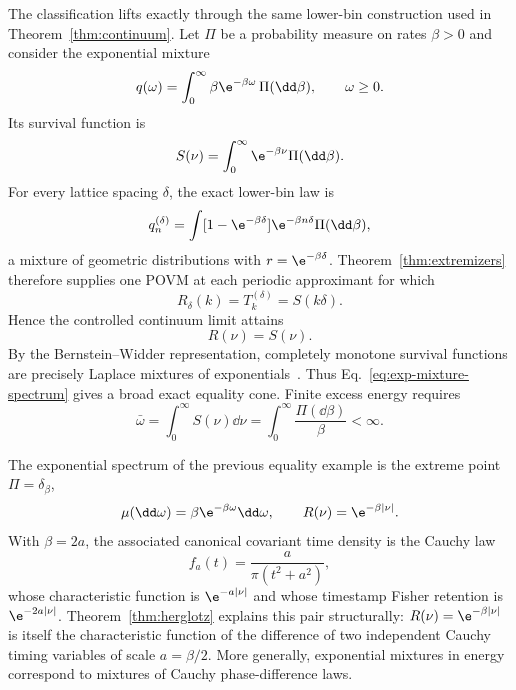 The classification lifts exactly through the same lower-bin construction used in Theorem~\ref{thm:continuum}.  Let $\Pi$ be a probability measure on rates $\beta>0$ and consider the exponential mixture
\begin{equation}
 q(\omega)=\int_0^\infty \beta\e^{-\beta\omega}\,\Pi(\dd\beta),
 \qquad \omega\geq0.
 \label{eq:exp-mixture-spectrum}
\end{equation}
Its survival function is
\begin{equation}
 S(\nu)=\int_0^\infty\e^{-\beta\nu}\Pi(\dd\beta).
 \label{eq:CM-survival}
\end{equation}
For every lattice spacing $\delta$, the exact lower-bin law is
\begin{equation}
 q_n^{(\delta)}
 =\int[1-\e^{-\beta\delta}]\e^{-\beta n\delta}\Pi(\dd\beta),
 \label{eq:lower-bin-mixture}
\end{equation}
a mixture of geometric distributions with $r=\e^{-\beta\delta}$.  Theorem~\ref{thm:extremizers} therefore supplies one POVM at each periodic approximant for which
\begin{equation}
 R_\delta(k)=T_k^{(\delta)}=S(k\delta).
\end{equation}
Hence the controlled continuum limit attains
\begin{equation}
 R(\nu)=S(\nu).
 \label{eq:CM-continuum-equality}
\end{equation}
By the Bernstein--Widder representation, completely monotone survival functions are precisely Laplace mixtures of exponentials~\cite{SchillingSongVondracek2012}.  Thus Eq.~\eqref{eq:exp-mixture-spectrum} gives a broad exact equality cone.  Finite excess energy requires
\begin{equation}
 \bar\omega=\int_0^\infty S(\nu)\dd\nu
 =\int_0^\infty\frac{\Pi(\dd\beta)}{\beta}<\infty.
 \label{eq:CM-mean}
\end{equation}

The exponential spectrum of the previous equality example is the extreme point $\Pi=\delta_\beta$,
\begin{equation}
 \mu(\dd\omega)=\beta\e^{-\beta\omega}\dd\omega,
 \qquad
 R(\nu)=\e^{-\beta|\nu|}.
 \label{eq:continuum-equality}
\end{equation}
With $\beta=2a$, the associated canonical covariant time density is the Cauchy law
\begin{equation}
 f_a(t)=\frac{a}{\pi(t^2+a^2)},
 \label{eq:Cauchy}
\end{equation}
whose characteristic function is $\e^{-a|\nu|}$ and whose timestamp Fisher retention is $\e^{-2a|\nu|}$.  Theorem~\ref{thm:herglotz} explains this pair structurally: $R(\nu)=\e^{-\beta|\nu|}$ is itself the characteristic function of the difference of two independent Cauchy timing variables of scale $a=\beta/2$.  More generally, exponential mixtures in energy correspond to mixtures of Cauchy phase-difference laws.

